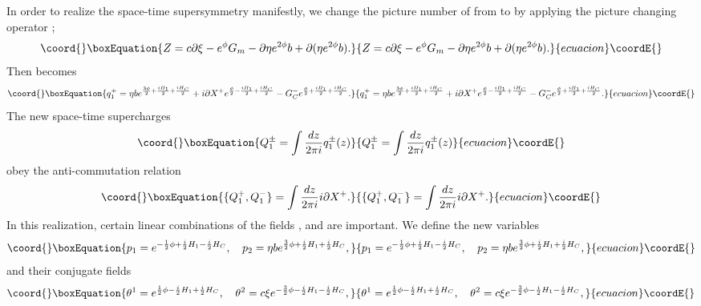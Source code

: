 \documentclass[a4paper,12pt]{article}
\begin{document}
In order to realize the space-time supersymmetry manifestly, we
change the picture number of \coordHE{} from \coordHE{} to
\coordHE{} 
by applying the picture changing operator \coordHE{};
\begin{equation}\coord{}\boxEquation{
 Z=c\partial\xi-e^{\phi}G_{m}-\partial\eta e^{2\phi}b +\partial
(\eta e^{2\phi}b).
}{
 Z=c\partial\xi-e^{\phi}G_{m}-\partial\eta e^{2\phi}b +\partial
(\eta e^{2\phi}b).
}{ecuacion}\coordE{}\end{equation}
Then \coordHE{} becomes
\begin{equation}\coord{}\boxEquation{
 q_{1}^{+}
=\eta b e^{{3\phi\over2}+{i H_{1}\over2}+{i H_{C}\over2}}
+i\partial X^{+} e^{{\phi\over2}-{i H_{1}\over2}+{i H_{C}\over2}}
-G_{C}^{-}e^{{\phi\over2}+{i H_{1}\over2}+{i H_{C}\over2}}.
}{
 q_{1}^{+}
=\eta b e^{{3\phi\over2}+{i H_{1}\over2}+{i H_{C}\over2}}
+i\partial X^{+} e^{{\phi\over2}-{i H_{1}\over2}+{i H_{C}\over2}}
-G_{C}^{-}e^{{\phi\over2}+{i H_{1}\over2}+{i H_{C}\over2}}.
}{ecuacion}\coordE{}\end{equation}
The new space-time supercharges
\begin{equation}\coord{}\boxEquation{
Q^{\pm}_{1}=\int {dz\over 2\pi i} q_{1}^{\pm}(z)
}{
Q^{\pm}_{1}=\int {dz\over 2\pi i} q_{1}^{\pm}(z)
}{ecuacion}\coordE{}\end{equation}
obey the anti-commutation relation
\begin{equation}\coord{}\boxEquation{
 \{ Q^{+}_{1}, Q^{-}_{1}\}=\int {dz\over 2\pi i}
i\partial X^{+}.
\label{eq:susy1}
}{
 \{ Q^{+}_{1}, Q^{-}_{1}\}=\int {dz\over 2\pi i}
i\partial X^{+}.
}{ecuacion}\coordE{}\end{equation}
In this realization, certain linear combinations
of the fields \myHighlight{$\phi$}\coordHE{}, \coordHE{} and \coordHE{} are important.
We define the new variables
\begin{equation}\coord{}\boxEquation{
 p_{1}=e^{-{1\over2}\phi+ {i\over 2}H_{1}- {i\over2} H_{C}},\quad
 p_{2}=\eta b e^{{3\over2}\phi+{i \over2}H_{1}+{i\over2}H_{C}},
}{
 p_{1}=e^{-{1\over2}\phi+ {i\over 2}H_{1}- {i\over2} H_{C}},\quad
 p_{2}=\eta b e^{{3\over2}\phi+{i \over2}H_{1}+{i\over2}H_{C}},
}{ecuacion}\coordE{}\end{equation}
and their conjugate fields
\begin{equation}\coord{}\boxEquation{
\theta^{1}= e^{{1\over2}\phi-{i\over2}H_{1}+{i\over2}H_{C}}, \quad
 \theta^{2}=c\xi e^{-{3\over2}\phi-{i\over2}H_{1}-{i\over2}H_{C}},
}{
\theta^{1}= e^{{1\over2}\phi-{i\over2}H_{1}+{i\over2}H_{C}}, \quad
 \theta^{2}=c\xi e^{-{3\over2}\phi-{i\over2}H_{1}-{i\over2}H_{C}},
}{ecuacion}\coordE{}\end{equation}
\end{document}

